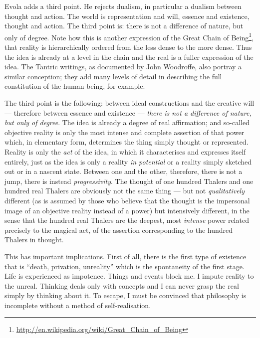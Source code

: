 Evola adds a third point. He rejects dualism, in particular a dualism between thought and action. The world is representation and will, essence and existence, thought and action. The third point is: there is not a difference of nature, but only of degree. Note how this is another expression of the Great Chain of Being\footnote{\url{http://en.wikipedia.org/wiki/Great_Chain_of_Being}}, that reality is hierarchically ordered from the less dense to the more dense. Thus the idea is already at a level in the chain and the real is a fuller expression of the idea. The Tantric writings, as documented by John Woodroffe, also portray a similar conception; they add many levels of detail in describing the full constitution of the human being, for example.

\begin{quotex}
The third point is the following: between ideal constructions and the creative will --- therefore between essence and existence --- \emph{there is not a difference of nature, but only of degree}. The idea is already a degree of real affirmation; and so-called objective reality is only the most intense and complete assertion of that power which, in elementary form, determines the thing simply thought or represented. Reality is only the \emph{act} of the idea, in which it characterises and expresses itself entirely, just as the idea is only a reality \emph{in potential} or a reality simply sketched out or in a nascent state. Between one and the other, therefore, there is not a jump, there is instead \emph{progressivity}. The thought of one hundred Thalers and one hundred real Thalers are obviously not the same thing --- but not \emph{qualitatively} different (as is assumed by those who believe that the thought is the impersonal image of an objective reality instead of a power) but intensively different, in the sense that the hundred real Thalers are the deepest, most \emph{intense} power related precisely to the magical act, of the assertion corresponding to the hundred Thalers in thought.
\end{quotex}


This has important implications. First of all, there is the first type of existence that is ``death, privation, unreality'' which is the spontaneity of the first stage. Life is experienced as impotence. Things and events block me. I impute reality to the unreal. Thinking deals only with concepts and I can never grasp the real simply by thinking about it. To escape, I must be convinced that philosophy is incomplete without a method of self-realisation.

